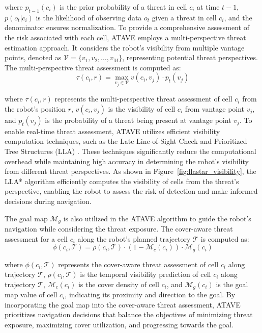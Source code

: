 where $p_{t-1}(c_i)$ is the prior probability of a threat in cell $c_i$ at time $t-1$, $p(o_t | c_i)$ is the likelihood of observing data $o_t$ given a threat in cell $c_i$, and the denominator ensures normalization.
To provide a comprehensive assessment of the risk associated with each cell, ATAVE employs a multi-perspective threat estimation approach. It considers the robot's visibility from multiple vantage points, denoted as $\mathcal{V} = \{v_1, v_2, \ldots, v_M\}$, representing potential threat perspectives. The multi-perspective threat assessment is computed as:
\begin{equation}
\tau(c_i, r) = \max_{v_j \in \mathcal{V}} v(c_i, v_j) \cdot p_t(v_j)
\end{equation}

where $\tau(c_i, r)$ represents the multi-perspective threat assessment of cell $c_i$ from the robot's position $r$, $v(c_i, v_j)$ is the visibility of cell $c_i$ from vantage point $v_j$, and $p_t(v_j)$ is the probability of a threat being present at vantage point $v_j$.
To enable real-time threat assessment, ATAVE utilizes efficient visibility computation techniques, such as the Late Line-of-Sight Check and Prioritized Tree Structures (LLA) \cite{Zhang2019LateLC}. These techniques significantly reduce the computational overhead while maintaining high accuracy in determining the robot's visibility from different threat perspectives. As shown in Figure~\ref{fig:llastar_visibility}, the LLA* algorithm efficiently computes the visibility of cells from the threat's perspective, enabling the robot to assess the risk of detection and make informed decisions during navigation.


The goal map $\mathcal{M}_g$ is also utilized in the ATAVE algorithm to guide the robot's navigation while considering the threat exposure. The cover-aware threat assessment for a cell $c_i$ along the robot's planned trajectory $\mathcal{T}$ is computed as:
\begin{equation}
\phi(c_i, \mathcal{T}) = \rho(c_i, \mathcal{T}) \cdot (1 - \mathcal{M}_c(c_i)) \cdot \mathcal{M}_g(c_i)
\end{equation}

where $\phi(c_i, \mathcal{T})$ represents the cover-aware threat assessment of cell $c_i$ along trajectory $\mathcal{T}$, $\rho(c_i, \mathcal{T})$ is the temporal visibility prediction of cell $c_i$ along trajectory $\mathcal{T}$, $\mathcal{M}_c(c_i)$ is the cover density of cell $c_i$, and $\mathcal{M}_g(c_i)$ is the goal map value of cell $c_i$, indicating its proximity and direction to the goal.
By incorporating the goal map into the cover-aware threat assessment, ATAVE prioritizes navigation decisions that balance the objectives of minimizing threat exposure, maximizing cover utilization, and progressing towards the goal. 

